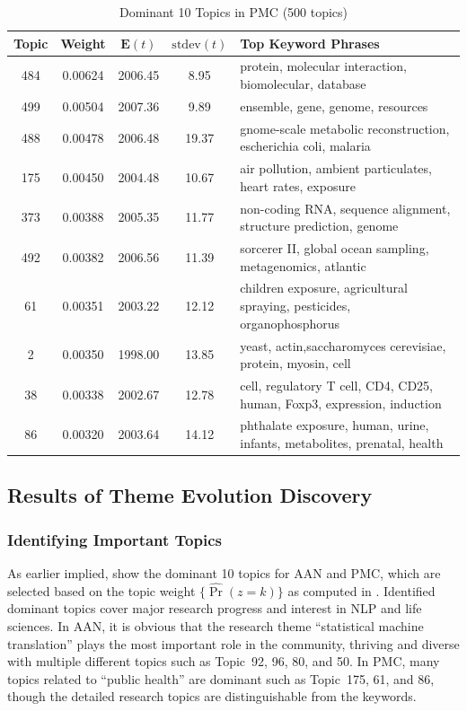 \begin{table}
\begin{center}
\caption{Dominant 10 Topics in PMC (500 topics)}\label{tab:pmc}
\begin{tabular}{|c|c|c|c|l|}
\hline
Topic 	& Weight	&$\mathbf{E}(t)$ & $\mathrm{stdev}(t)$ &
  Top Keyword Phrases\\ \hline \hline
484		& 0.00624	& 2006.45	&8.95		&
  protein, molecular interaction, biomolecular, database\\
499		& 0.00504	& 2007.36	&9.89		&
  ensemble, gene, genome, resources \\
488		& 0.00478	& 2006.48	&19.37	&
  gnome-scale metabolic reconstruction, escherichia coli, malaria\\
175		& 0.00450	& 2004.48	&10.67	&
  air pollution, ambient particulates, heart rates, exposure\\
373		& 0.00388	& 2005.35	&11.77	&
  non-coding RNA, sequence alignment, structure prediction, genome \\
492		& 0.00382	& 2006.56	&11.39	&
  sorcerer II, global ocean sampling, metagenomics, atlantic \\
61		& 0.00351	& 2003.22	&12.12	&
  children exposure, agricultural spraying, pesticides, organophosphorus \\
2		& 0.00350	& 1998.00	&13.85		&
  yeast, actin,saccharomyces cerevisiae, protein, myosin, cell \\
38		& 0.00338	& 2002.67	&12.78		&
  cell,	regulatory T cell, CD4, CD25, human, Foxp3, expression, induction \\
86		& 0.00320	& 2003.64	&14.12		&
  phthalate exposure, human, urine, infants, metabolites, prenatal, health \\
  \hline\hline
\end{tabular}
\end{center}
\end{table}

\subsection{Results of Theme Evolution Discovery}

\subsubsection{Identifying Important Topics}

As earlier implied,  show the dominant 10 topics for AAN
and PMC, which are selected based on the topic weight $\{\hat\Pr(z=k)\}$ as
computed in . Identified dominant topics cover
major research progress and interest in NLP and life sciences. In AAN,  it is
obvious that the research theme ``statistical machine translation'' plays the
most important role in the community, thriving and diverse with multiple
different topics such as Topic~92, 96, 80, and 50. In PMC, many topics related
to ``public health'' are dominant such as Topic~175, 61, and 86, though the
detailed research topics are distinguishable from the keywords.

